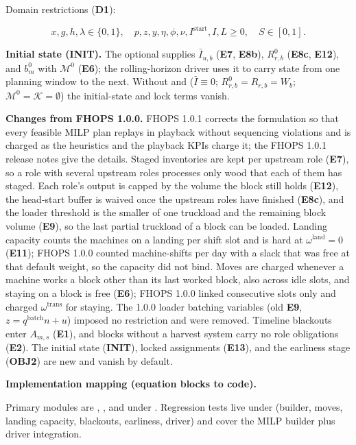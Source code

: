 Domain restrictions (\textbf{D1}):

\[
x, g, h, \lambda \in \{0,1\},\quad p,z,y,\eta,\phi,\nu,I^{\text{start}},I,L \ge 0,\quad S \in [0,1].
\]

\textbf{Initial state (INIT).} The optional
 supplies \(\bar{I}_{u,b}\)
(\textbf{E7}, \textbf{E8b}), \(R^{0}_{r,b}\) (\textbf{E8c},
\textbf{E12}), and \(b^{0}_m\) with \(\mathcal{M}^{0}\) (\textbf{E6});
the rolling-horizon driver uses it to carry state from one planning
window to the next. Without  and
 (\(\bar{I}\equiv 0\);
\(R^{0}_{r,b}= R_{r,b}= W_b\);
\(\mathcal{M}^{0}=\mathcal{K}=\emptyset\)) the initial-state and lock
terms vanish.

\textbf{Changes from FHOPS 1.0.0.} FHOPS 1.0.1 corrects the formulation
so that every feasible MILP plan replays in playback without sequencing
violations and is charged as the heuristics and the playback KPIs charge
it; the FHOPS 1.0.1 release notes give the details. Staged inventories
are kept per upstream role (\textbf{E7}), so a role with several
upstream roles processes only wood that each of them has staged. Each
role's output is capped by the volume the block still holds
(\textbf{E12}), the head-start buffer is waived once the upstream roles
have finished (\textbf{E8c}), and the loader threshold is the smaller of
one truckload and the remaining block volume (\textbf{E9}), so the last
partial truckload of a block can be loaded. Landing capacity counts the
machines on a landing per shift slot and is hard at
\(\omega^{\text{land}}=0\) (\textbf{E11}); FHOPS 1.0.0 counted
machine-shifts per day with a slack that was free at that default
weight, so the capacity did not bind. Moves are charged whenever a
machine works a block other than its last worked block, also across idle
slots, and staying on a block is free (\textbf{E6}); FHOPS 1.0.0 linked
consecutive slots only and charged \(\omega^{\text{trans}}\) for
staying. The 1.0.0 loader batching variables (old \textbf{E9},
\(z=q^{\text{batch}}n+u\)) imposed no restriction and were removed.
Timeline blackouts enter \(A_{m,s}\) (\textbf{E1}), and blocks without a
harvest system carry no role obligations (\textbf{E2}). The initial
state (\textbf{INIT}), locked assignments (\textbf{E13}), and the
earliness stage (\textbf{OBJ2}) are new and vanish by default.

\textbf{Implementation mapping (equation blocks to code).}

Primary modules are , , and
 under . Regression tests
live under  (builder, moves, landing capacity,
blackouts, earliness, driver) and cover the MILP builder plus driver
integration.

